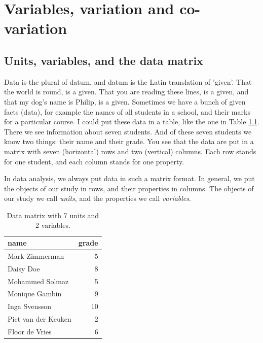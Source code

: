 \documentclass[]{book}\usepackage[]{graphicx}\usepackage[]{color}
\begin{document}
\tableofcontents






\chapter{Variables, variation and co-variation} \label{chap:intro}


\section{Units, variables, and the data matrix}



Data is the plural of datum, and datum is the Latin translation of 'given'. That the world is round, is a given. That you are reading these lines, is a given, and that my dog's name is Philip, is a given. Sometimes we have a bunch of given facts (data), for example the names of all students in a school, and their marks for a particular course. I could put these data in a table, like the one in Table \ref{tab:data_1}. There we see information about seven students. And of these seven students we know two things: their name and their grade. You see that the data are put in a matrix with seven (horizontal) rows and two (vertical) columns. Each row stands for one student, and each column stands for one property.

In data analysis, we always put data in such a matrix format. In general, we put the objects of our study in rows, and their properties in columns. The objects of our study we call \textit{units}, and the properties we call \textit{variables}.

\begin{table}[ht]
\centering
\caption{Data matrix with 7 units and 2 variables.} 
\label{tab:data_1}
\begin{tabular}{lr}
  \hline
name & grade \\ 
  \hline
Mark Zimmerman & 5 \\ 
  Daisy Doe & 8 \\ 
  Mohammed Solmaz & 5 \\ 
  Monique Gambin & 9 \\ 
  Inga Svensson & 10 \\ 
  Piet van der Keuken & 2 \\ 
  Floor de Vries & 6 \\ 
   \hline
\end{tabular}
\end{table}
\end{document}

